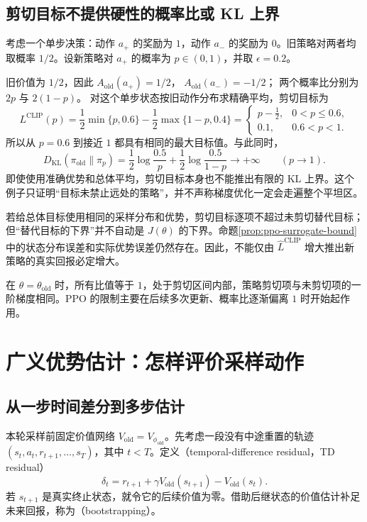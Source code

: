 \documentclass[UTF8]{ctexart}
\begin{document}
\subsection{剪切目标不提供硬性的概率比或 KL 上界}

\begin{example}
\label{ex:ppo-bandit}
考虑一个单步决策：动作 $a_+$ 的奖励为 $1$，动作 $a_-$ 的奖励为 $0$。旧策略对两者均取概率 $1/2$。设新策略对 $a_+$ 的概率为 $p\in(0,1)$，并取 $\epsilon=0.2$。
\end{example}
\begin{solve}
旧价值为 $1/2$，因此
$A_{\mathrm{old}}(a_+)=1/2$，
$A_{\mathrm{old}}(a_-)=-1/2$；
两个概率比分别为 $2p$ 与 $2(1-p)$。
对这个单步状态按旧动作分布求精确平均，剪切目标为
\[
  L^{\mathrm{CLIP}}(p)
  =\frac12\min\{p,0.6\}
   -\frac12\max\{1-p,0.4\}
  =
  \begin{cases}
    p-\tfrac12,&0<p\le0.6,\\
    0.1,&0.6<p<1.
  \end{cases}
\]
所以从 $p=0.6$ 到接近 $1$ 都具有相同的最大目标值。与此同时，
\[
  D_{\mathrm{KL}}(\pi_{\mathrm{old}}\|\pi_p)
  =\frac12\log\frac{0.5}{p}
   +\frac12\log\frac{0.5}{1-p}
  \longrightarrow+\infty
  \qquad(p\to1).
\]
即使使用准确优势和总体平均，剪切目标本身也不能推出有限的 KL 上界。这个例子只证明“目标未禁止远处的策略”，并不声称梯度优化一定会走遍整个平坦区。
\end{solve}

若给总体目标使用相同的采样分布和优势，剪切目标逐项不超过未剪切替代目标；但“替代目标的下界”并不自动是 $J(\theta)$ 的下界。命题\ref{prop:ppo-surrogate-bound}中的状态分布误差和实际优势误差仍然存在。因此，不能仅由 $\widehat L^{\mathrm{CLIP}}$ 增大推出新策略的真实回报必定增大。

在 $\theta=\theta_{\mathrm{old}}$ 时，所有比值等于 $1$，处于剪切区间内部，策略剪切项与未剪切项的一阶梯度相同。PPO 的限制主要在后续多次更新、概率比逐渐偏离 $1$ 时开始起作用。

\section{广义优势估计：怎样评价采样动作}
\label{sec:ppo-gae}

\subsection{从一步时间差分到多步估计}

本轮采样前固定价值网络
$V_{\mathrm{old}}=V_{\phi_{\mathrm{old}}}$。先考虑一段没有中途重置的轨迹
$(s_t,a_t,r_{t+1},\ldots,s_T)$，其中 $t<T$。定义（temporal-difference residual，TD residual）
\begin{equation}
  \delta_t=r_{t+1}+\gamma V_{\mathrm{old}}(s_{t+1})
           -V_{\mathrm{old}}(s_t).
  \label{eq:ppo-td}
\end{equation}
若 $s_{t+1}$ 是真实终止状态，就令它的后续价值为零。借助后继状态的价值估计补足未来回报，称为（bootstrapping）。
\end{document}

